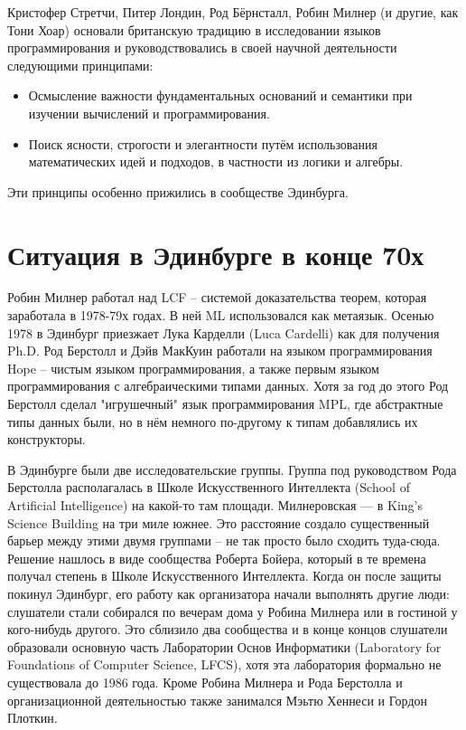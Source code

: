 \documentclass[14pt]{matmex-diploma-custom}
\begin{document}
Кристофер Стретчи, Питер Лондин, Род Бёрнсталл, Робин Милнер (и другие, как Тони Хоар) основали британскую традицию в исследовании языков программирования и руководствовались в своей научной деятельности следующими принципами:

\begin{itemize}
 \item Осмысление важности фундаментальных оснований и семантики при изучении вычислений и программирования.
 \item Поиск ясности, строгости и элегантности путём использования математических идей и подходов, в частности из логики и алгебры.
\end{itemize}

Эти принципы особенно прижились в сообществе Эдинбурга.
 
\section{Ситуация в Эдинбурге в конце 70х}
Робин Милнер работал над LCF -- системой доказательства теорем, которая заработала в 1978-79х годах. В ней ML использовался как метаязык. %
Осенью 1978 в Эдинбург приезжает Лука Карделли (Luca Cardelli) как для получения Ph.D. Род Берстолл и Дэйв МакКуин работали на языком программирования Hope -- чистым языком программирования, а также первым языком программирования с алгебраическими типами данных. Хотя за год до этого Род Берстолл сделал "игрушечный" язык программирования MPL, где абстрактные типы данных были, но в нём немного по-другому к типам добавлялись их конструкторы.  

В Эдинбурге были две исследовательские группы. Группа под руководством Рода Берстолла располагалась в Школе Искусственного Интеллекта (School of Artificial Intelligence) на какой-то там площади. Милнеровская --- в King’s Science Building на три миле южнее. Это расстояние создало существенный барьер между этими двумя группами -- не так просто было сходить туда-сюда. Решение нашлось в виде сообщества Роберта Бойера, который в те времена получал степень в Школе Искусственного Интеллекта.
Когда он после защиты покинул Эдинбург, его работу как организатора начали выполнять другие люди: слушатели стали  собирался по вечерам дома у Робина Милнера  или в гостиной у кого-нибудь другого. Это сблизило два сообщества и в конце концов слушатели образовали основную часть Лаборатории Основ Информатики (Laboratory for Foundations of Computer Science, LFCS), хотя эта лаборатория формально не существовала до 1986 года.  Кроме Робина Милнера и Рода Берстолла и организационной деятельностью также занимался Мэьтю Хеннеси и Гордон Плоткин.
\end{document}
